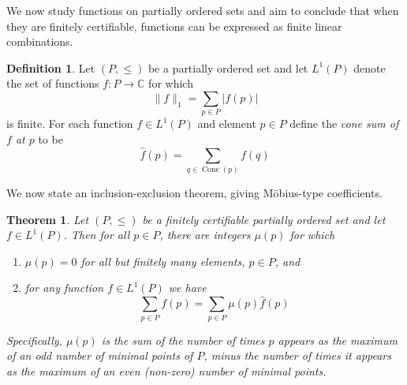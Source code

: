 \documentclass{memo-l}
\theoremstyle{plain}
\theoremstyle{definition}
\numberwithin{section}{chapter}
\numberwithin{equation}{chapter}
\DeclareMathOperator{\Cone}{Cone}
\newcommand{\from}{\colon}
\theoremstyle{plain}
\newtheorem{thm}[theorem]{Theorem}
\theoremstyle{definition}
\newtheorem{defn}[theorem]{Definition}
\newcommand\CC{\mathbb{C}}
\begin{document}
We now study functions on partially ordered sets and aim to conclude that
when they are finitely certifiable, functions can be expressed as finite
linear combinations.

\begin{defn} Let \( (P,\leq) \) be a partially ordered set and let \(
L^1(P) \) denote the set of functions \( f \from P \to \CC \) for which \[
\| f \|_1 = \sum_{p \in P}|f(p)| \] is finite. For each function \(f \in
L^1(P)\) and element \( p \in P \) define the \emph{cone sum of \(f\) at
\(p\)} to be \[ \widehat f(p) = \sum_{q \in \Cone(p)} \!\!\!\!\!\!f(q) \]
\end{defn}

We now state an inclusion-exclusion theorem, giving M\"obius-type
coefficients.

\begin{thm}\label{thm:mobius_proof} Let \( (P,\leq) \) be a finitely
certifiable partially ordered set and let \( f \in L^1(P) \). Then for all
\(p \in P\), there are integers \( \mu(p) \) for which
\begin{enumerate}[label= (\arabic*)] \item \( \mu(p) = 0 \) for all but
finitely many elements, \(p \in P\), and \item for any function \( f \in
L^1(P) \) we have \[ \sum_{p \in P} f(p) = \sum_{p \in P} \mu(p) \widehat
f(p) \] \end{enumerate} Specifically, \( \mu(p) \) is the sum of the number
of times \(p\) appears as the maximum of an odd number of minimal points of
\(P\), minus the number of times it appears as the maximum of an even
(non-zero) number of minimal points.  
\end{thm} 
\end{document}

